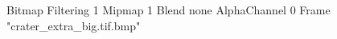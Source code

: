 {Bitmap
	{Filtering 1}
	{Mipmap 1}
	{Blend none}
	{AlphaChannel 0}
	{Frame "crater_extra_big.tif.bmp"}
}
